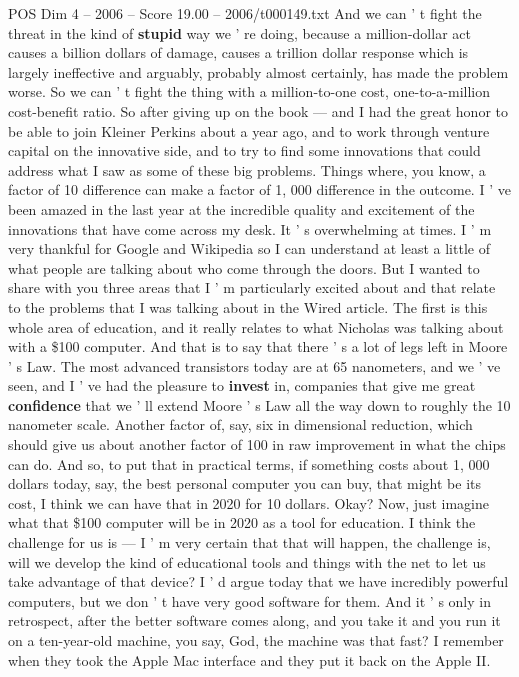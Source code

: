 \begin{textsample}{POS Dim 4 – 2006 – Score 19.00 – 2006/t000149.txt}
And we can ' t fight the threat in the kind of \textbf{stupid} way we ' re doing, because a million-dollar act causes a billion dollars of damage, causes a trillion dollar response which is largely ineffective and arguably, probably almost certainly, has made the problem worse.
So we can ' t fight the thing with a million-to-one cost, one-to-a-million cost-benefit ratio.
So after giving up on the book — and I had the great honor to be able to join Kleiner Perkins about a year ago, and to work through venture capital on the innovative side, and to try to find some innovations that could address what I saw as some of these big problems.
Things where, you know, a factor of 10 difference can make a factor of 1, 000 difference in the outcome.
I ' ve been amazed in the last year at the incredible quality and excitement of the innovations that have come across my desk.
It ' s overwhelming at times.
I ' m very thankful for Google and Wikipedia so I can understand at least a little of what people are talking about who come through the doors.
But I wanted to share with you three areas that I ' m particularly excited about and that relate to the problems that I was talking about in the Wired article.
The first is this whole area of education, and it really relates to what Nicholas was talking about with a \$100 computer.
And that is to say that there ' s a lot of legs left in Moore ' s Law.
The most advanced transistors today are at 65 nanometers, and we ' ve seen, and I ' ve had the pleasure to \textbf{invest} in, companies that give me great \textbf{confidence} that we ' ll extend Moore ' s Law all the way down to roughly the 10 nanometer scale.
Another factor of, say, six in dimensional reduction, which should give us about another factor of 100 in raw improvement in what the chips can do.
And so, to put that in practical terms, if something costs about 1, 000 dollars today, say, the best personal computer you can buy, that might be its cost, I think we can have that in 2020 for 10 dollars.
Okay?
Now, just imagine what that \$100 computer will be in 2020 as a tool for education.
I think the challenge for us is — I ' m very certain that that will happen, the challenge is, will we develop the kind of educational tools and things with the net to let us take advantage of that device?
I ' d argue today that we have incredibly powerful computers, but we don ' t have very good software for them.
And it ' s only in retrospect, after the better software comes along, and you take it and you run it on a ten-year-old machine, you say, God, the machine was that fast?
I remember when they took the Apple Mac interface and they put it back on the Apple II.

\end{textsample}
